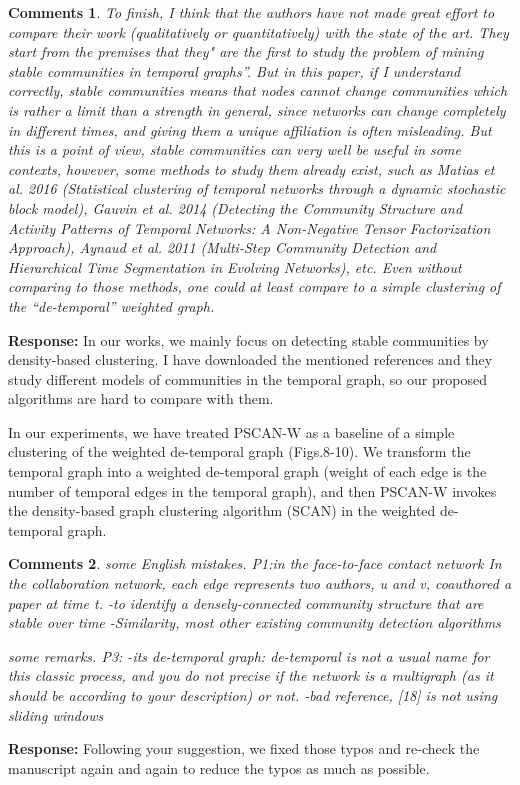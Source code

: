 \documentclass{article}
\newtheorem{Comments}{\textbf{Comments}}
\begin{document}
\begin{Comments}

To finish, I think that the authors have not made great effort to compare their work (qualitatively or quantitatively) with the state of the art. They start from the premises that they" are the first to study the problem of mining stable communities in temporal graphs”. But in this paper, if I understand correctly, stable communities means that nodes cannot change communities which is rather a limit than a strength in general, since networks can change completely in different times, and giving them a unique affiliation is often misleading. But this is a point of view, stable communities can very well be useful in some contexts, however, some methods to study them already exist, such as Matias et al. 2016 (Statistical clustering of temporal networks through a dynamic stochastic block model), Gauvin et al.  2014 (Detecting the Community Structure and Activity Patterns of Temporal Networks: A Non-Negative Tensor Factorization Approach), Aynaud et al. 2011 (Multi-Step Community Detection and Hierarchical Time Segmentation in Evolving Networks), etc.
Even without comparing to those methods, one could at least compare to a simple clustering of the “de-temporal” weighted graph.
\end{Comments}
\noindent \textbf{Response: } In our works, we mainly focus on detecting stable communities by density-based clustering. I have downloaded the mentioned references and they study different models of communities in the temporal graph, so our proposed algorithms are hard to compare with them.

In our experiments, we have treated PSCAN-W as a baseline of a simple clustering of the weighted de-temporal graph (Figs.8-10). We transform the temporal graph into a weighted de-temporal graph (weight of each edge is the number of temporal edges in the temporal graph), and then PSCAN-W invokes the density-based graph clustering algorithm (SCAN) in the weighted de-temporal graph. 


\begin{Comments}
	
some English mistakes.
P1:in the face-to-face contact network
In the collaboration network, each edge represents two authors, u and v, coauthored a paper at time t.
-to identify a densely-connected community structure that are stable over time
-Similarity, most other existing community detection algorithms

some remarks.
P3:
-its de-temporal graph: de-temporal is not a usual name for this classic process, and you do not precise if the network is a multigraph (as it should be according to your description) or not.
-bad reference, [18] is not using sliding windows

\end{Comments}
\noindent \textbf{Response: } Following your suggestion, we fixed those typos and re-check the manuscript again and again to reduce the typos as much as possible.
\end{document}
